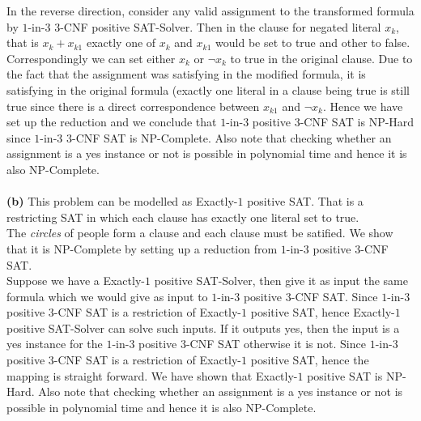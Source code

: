 \documentclass{article}
\begin{document}
In the reverse direction, consider any valid assignment to the transformed formula by $1$-in-$3$ $3$-CNF positive SAT-Solver. Then in the clause for negated literal $x_{k}$, that is $x_{k}+x_{k1}$ exactly one of $x_{k}$ and $x_{k1}$ would be set to true and other to false. Correspondingly we can set either $x_{k}$ or $\neg x_{k}$ to true in the original clause. Due to the fact that the assignment was satisfying in the modified formula, it is satisfying in the original formula (exactly one literal in a clause being true is still true since there is a direct correspondence between $x_{k1}$ and $\neg x_{k}$. Hence we have set up the reduction and we conclude that  $1$-in-$3$ positive $3$-CNF SAT is NP-Hard since  $1$-in-$3$ $3$-CNF SAT is NP-Complete. Also note that checking whether an assignment is a yes instance or not is possible in polynomial time and hence it is also NP-Complete. \\\\
{\bf (b)} This problem can be modelled as Exactly-$1$ positive SAT. That is a restricting SAT in which each clause has exactly one literal set to true.\\ The {\it circles} of people form a clause and each clause must be satified. We show that it is NP-Complete by setting up a reduction from  $1$-in-$3$ positive $3$-CNF SAT.\\ Suppose we have a Exactly-$1$ positive SAT-Solver, then give it as input the same formula which we would give as input to  $1$-in-$3$ positive $3$-CNF SAT. Since  $1$-in-$3$ positive $3$-CNF SAT is a restriction of Exactly-$1$ positive SAT, hence Exactly-$1$ positive SAT-Solver can solve such inputs. If it outputs yes, then the input is a yes instance for the $1$-in-$3$ positive $3$-CNF SAT otherwise it is not. Since $1$-in-$3$ positive $3$-CNF SAT is a restriction of Exactly-$1$ positive SAT, hence the mapping is straight forward. We have shown that Exactly-$1$ positive SAT is NP-Hard. Also note that checking whether an assignment is a yes instance or not is possible in polynomial time and hence it is also NP-Complete. \\\\
\end{document}
